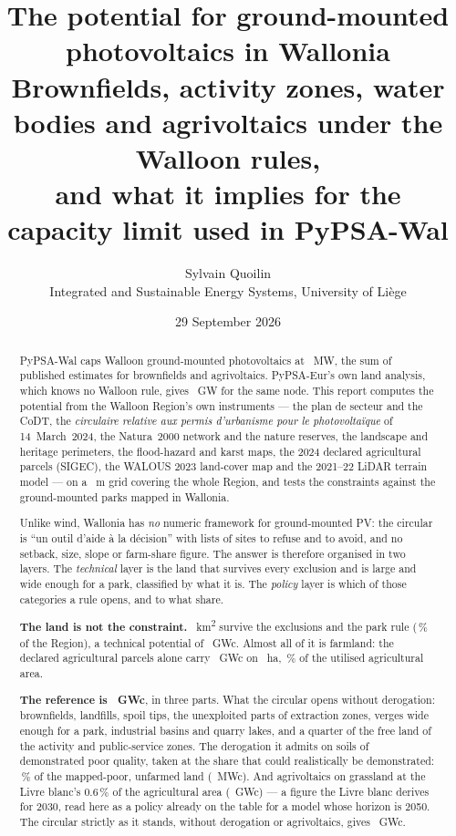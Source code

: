 \documentclass[11pt,a4paper]{article}
\title{\textbf{The potential for ground-mounted photovoltaics in Wallonia}\\[2mm]
\large Brownfields, activity zones, water bodies and agrivoltaics under the
Walloon rules,\\ and what it implies for the capacity limit used in PyPSA-Wal}
\author{Sylvain Quoilin \\ \small Integrated and Sustainable Energy Systems, University of Liège}
\date{29 September 2026}
\begin{document}
\maketitle
\thispagestyle{fancy}

\begin{abstract}
\noindent
PyPSA-Wal caps Walloon ground-mounted photovoltaics at \ModelCapMW{}~MW, the
sum of published estimates for brownfields and agrivoltaics. PyPSA-Eur's own
land analysis, which knows no Walloon rule, gives \PypsaEurGW{}~GW for the
same node. This report computes the potential from the Walloon Region's own
instruments --- the plan de secteur and the CoDT, the \emph{circulaire relative
aux permis d'urbanisme pour le photovoltaïque} of 14~March~2024, the Natura~2000
network and the nature reserves, the landscape and heritage perimeters, the
flood-hazard and karst maps, the 2024 declared agricultural parcels (SIGEC), the
WALOUS 2023 land-cover map and the 2021--22 LiDAR terrain model --- on a
\GridRes{}~m grid covering the whole Region, and tests the constraints against
the \FleetN{} ground-mounted parks mapped in Wallonia.

Unlike wind, Wallonia has \emph{no} numeric framework for ground-mounted PV:
the circular is ``un outil d'aide à la décision'' with lists of sites to refuse
and to avoid, and no setback, size, slope or farm-share figure. The answer is
therefore organised in two layers. The \emph{technical} layer is the land that
survives every exclusion and is large and wide enough for a park, classified by
what it is. The \emph{policy} layer is which of those categories a rule opens,
and to what share.

\textbf{The land is not the constraint.} \LeftParkRuleKm{}~km\textsuperscript{2}
survive the exclusions and the park rule (\LeftParkRulePct{}\,\% of the
Region), a technical potential of \TechGW{}~GWc. Almost all of it is farmland:
the declared agricultural parcels alone carry \TechAgriGW{}~GWc on
\TechAgriHa{}~ha, \TechAgriShareSau{}\,\% of the utilised agricultural area.

\textbf{The reference is \RefGW{}~GWc}, in three parts. What the circular
opens without derogation: brownfields, landfills, spoil tips, the unexploited
parts of extraction zones, verges wide enough for a park, industrial basins and
quarry lakes, and a quarter of the free land of the activity and public-service
zones. The derogation it admits on soils of demonstrated poor quality, taken at
the share that could realistically be demonstrated: \EvShare{}\,\% of the
mapped-poor, unfarmed land (\RefPoorMW{}~MWc). And agrivoltaics on grassland at
the Livre blanc's 0.6\,\% of the agricultural area (\RefAgriGW{}~GWc) --- a
figure the Livre blanc derives for 2030, read here as a policy already on the
table for a model whose horizon is 2050. The circular strictly as it stands,
without derogation or agrivoltaics, gives \SRulesInForceGW{}~GWc.


\end{abstract}
\end{document}
